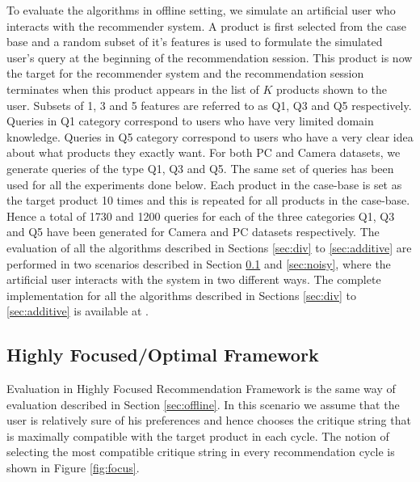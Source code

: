 To evaluate the algorithms in offline setting, we simulate an artificial user who interacts with the recommender system.
A product is first selected from the case base and a random subset of it's features is used to formulate the simulated user's query at the beginning of the recommendation session.
This product is now the target for the recommender system and the recommendation session terminates when this product appears in the list of $K$ products shown to the user. 
Subsets of 1, 3 and 5 features are referred to as Q1, Q3 and Q5 respectively.
Queries in Q1 category correspond to users who have very limited domain knowledge.
Queries in Q5 category correspond to users who have a very clear idea about what products they exactly want.
For both PC and Camera datasets, we generate queries of the type Q1, Q3 and Q5.
The same set of queries has been used for all the experiments done below.
Each product in the case-base is set as the target product 10 times and this is repeated for all products in the case-base.
Hence a total of 1730 and 1200 queries for each of the three categories Q1, Q3 and Q5 have been generated for Camera and PC datasets respectively.
The evaluation of all the algorithms described in Sections \ref{sec:div} to \ref{sec:additive} are performed in two scenarios described in Section \ref{sec:focus} and \ref{sec:noisy}, where the artificial user interacts with the system in two different ways.
The complete implementation for all the algorithms described in Sections \ref{sec:div} to \ref{sec:additive} is available at 
\cite{implementation}.

\subsection{Highly Focused/Optimal Framework}
\label{sec:focus}
Evaluation in Highly Focused Recommendation Framework is the same way of evaluation described in Section \ref{sec:offline}.
In this scenario we assume that the user is relatively sure of his preferences and hence chooses the critique string that is maximally compatible with the target product in each cycle.
The notion of selecting the most compatible critique string in every recommendation cycle is shown in Figure \ref{fig:focus}.

